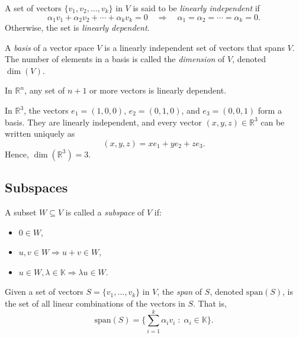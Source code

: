 \begin{definition}
A set of vectors $\{v_1,v_2,\dots,v_k\}$ in $V$ is said to be \emph{linearly independent} if 
\begin{equation}
\alpha_1 v_1 + \alpha_2 v_2 + \cdots + \alpha_k v_k = 0 \quad \Rightarrow \quad \alpha_1=\alpha_2=\cdots=\alpha_k=0.
\end{equation}
Otherwise, the set is \emph{linearly dependent}.
\end{definition}

\begin{definition}
A \emph{basis} of a vector space $V$ is a linearly independent set of vectors that spans $V$.  
The number of elements in a basis is called the \emph{dimension} of $V$, denoted $\dim(V)$.
\end{definition}

\begin{theorem}
In $\mathbb{R}^n$, any set of $n+1$ or more vectors is linearly dependent.
\end{theorem}

\begin{example}
In $\mathbb{R}^3$, the vectors $e_1=(1,0,0)$, $e_2=(0,1,0)$, and $e_3=(0,0,1)$ form a basis.  
They are linearly independent, and every vector $(x,y,z) \in \mathbb{R}^3$ can be written uniquely as 
\begin{equation}
(x,y,z) = x e_1 + y e_2 + z e_3.
\end{equation}
Hence, $\dim(\mathbb{R}^3)=3$.
\end{example}

\subsection{Subspaces}

\begin{definition}[Subspace]
A subset $W \subseteq V$ is called a \emph{subspace} of $V$ if:
\begin{itemize}
    \item $0 \in W$,
    \item $u,v \in W \Rightarrow u+v \in W$,
    \item $u \in W, \lambda \in \mathbb{K} \Rightarrow \lambda u \in W$.
\end{itemize}
\end{definition}

\begin{definition}[Span]
Given a set of vectors $S = \{v_1,\dots,v_k\}$ in $V$, the \emph{span} of $S$, denoted $\mathrm{span}(S)$, is the set of all linear combinations of the vectors in $S$.  
That is, 
\begin{equation}
\mathrm{span}(S) = \Big\{ \sum_{i=1}^k \alpha_i v_i \; : \; \alpha_i \in \mathbb{K} \Big\}.
\end{equation}
\end{definition}

